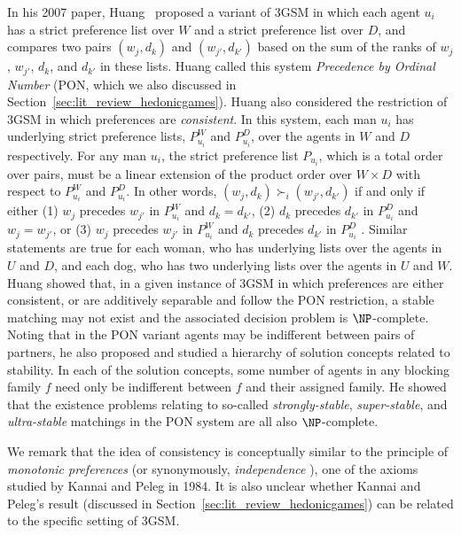 In his 2007 paper, Huang~\cite{Huang07conference} proposed a variant of 3GSM in which each agent $u_i$ has a strict preference list over $W$ and a strict preference list over $D$, and compares two pairs $( w_j, d_k )$ and $( w_{j'}, d_{k'} )$ based on the sum of the ranks of $w_j$, $w_{j'}$, $d_k$, and $d_{k'}$ in these lists. Huang called this system \emph{Precedence by Ordinal Number} (PON, which we also discussed in Section~\ref{sec:lit_review_hedonicgames}). Huang also considered the restriction of 3GSM in which preferences are \emph{consistent}. In this system, each man $u_i$ has underlying strict preference lists, $P_{u_i}^W$ and $P_{u_i}^D$, over the agents in $W$ and $D$ respectively. For any man $u_i$, the strict preference list $P_{u_i}$, which is a total order over pairs, must be a linear extension of the product order over $W \times D$ with respect to $P_{u_i}^W$ and $P_{u_i}^D$. In other words, $(w_j, d_k) \succ_i (w_{j'}, d_{k'})$ if and only if either (1) $w_j$ precedes $w_{j'}$ in $P_{u_i}^W$ and $d_k = d_{k'}$, (2) $d_k$ precedes $d_{k'}$ in $P_{u_i}^D$ and $w_j = w_{j'}$, or (3) $w_j$ precedes $w_{j'}$ in $P_{u_i}^W$ and $d_k$ precedes $d_{k'}$ in $P_{u_i}^D$ \cite{AMUP}. Similar statements are true for each woman, who has underlying lists over the agents in $U$ and $D$, and each dog, who has two underlying lists over the agents in $U$ and $W$. Huang showed that, in a given instance of 3GSM in which preferences are either consistent, or are additively separable and follow the PON restriction, a stable matching may not exist and the associated decision problem is $\NP$-complete. Noting that in the PON variant agents may be indifferent between pairs of partners, he also proposed and studied a hierarchy of solution concepts related to stability. In each of the solution concepts, some number of agents in any blocking family $f$ need only be indifferent between $f$ and their assigned family. He showed that the existence problems relating to so-called \emph{strongly-stable}, \emph{super-stable}, and \emph{ultra-stable} matchings in the PON system are all also $\NP$-complete.

We remark that the idea of consistency is conceptually similar to the principle of \emph{monotonic preferences} (or synonymously, \emph{independence} \cite{BBP04}), one of the axioms studied by Kannai and Peleg \cite{KANNAI1984172} in 1984. It is also unclear whether Kannai and Peleg's result (discussed in Section~\ref{sec:lit_review_hedonicgames}) can be related to the specific setting of 3GSM.

